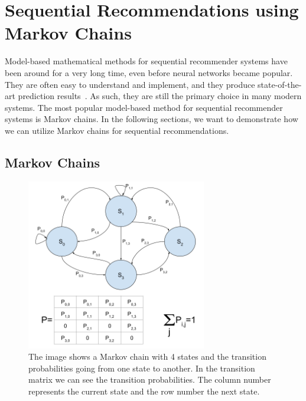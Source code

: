 \chapter{Sequential Recommendations using Markov Chains}
\label{chapter:model_based}

Model-based mathematical methods for sequential recommender systems have been around for a very long time, even before neural networks became popular. They are often easy to understand and implement, and they produce state-of-the-art prediction results~\cite{zimdars2013using,hu2008collaborative}. As such, they are still the primary choice in many modern systems. The most popular model-based method for sequential recommender systems is Markov chains. In the following sections, we want to demonstrate how we can utilize Markov chains for sequential recommendations.

\section{Markov Chains}
\label{sec:markov_chains}

\begin{figure}[htbp]
\centering
\includegraphics[width=0.7\textwidth]{images/diagrams/markov_chain.png}
\caption{The image shows a Markov chain with 4 states and the transition probabilities going from one state to another. In the transition matrix we can see the transition probabilities. The column number represents the current state and the row number the next state.}
\label{fig:markov_chains}
\end{figure}

